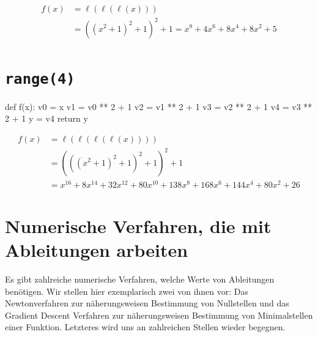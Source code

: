\documentclass[
  a4paper,
  DIV=11]{scrreprt}
\newenvironment{Shaded}{\begin{snugshade}}{\end{snugshade}}
\newcommand{\ControlFlowTok}[1]{\textcolor[rgb]{0.00,0.23,0.31}{#1}}
\newcommand{\DecValTok}[1]{\textcolor[rgb]{0.68,0.00,0.00}{#1}}
\newcommand{\KeywordTok}[1]{\textcolor[rgb]{0.00,0.23,0.31}{#1}}
\newcommand{\NormalTok}[1]{\textcolor[rgb]{0.00,0.23,0.31}{#1}}
\newcommand{\OperatorTok}[1]{\textcolor[rgb]{0.37,0.37,0.37}{#1}}
\theoremstyle{definition}
\theoremstyle{definition}
\theoremstyle{remark}
\begin{document}
\begin{tcolorbox}
\begin{align*}
    f(x) &= \ell(\ell(\ell(x))) \\
         &= ((x^2 + 1)^2 + 1)^2 + 1 = x^8 + 4x^6 + 8x^4 + 8x^2 + 5
\end{align*}

\section{\texorpdfstring{\texttt{range(4)}}{range(4)}}

\begin{Shaded}
\begin{Highlighting}[]
\KeywordTok{def}\NormalTok{ f(x):}
\NormalTok{    v0 }\OperatorTok{=}\NormalTok{ x}
\NormalTok{    v1 }\OperatorTok{=}\NormalTok{ v0 }\OperatorTok{**} \DecValTok{2} \OperatorTok{+} \DecValTok{1}
\NormalTok{    v2 }\OperatorTok{=}\NormalTok{ v1 }\OperatorTok{**} \DecValTok{2} \OperatorTok{+} \DecValTok{1}
\NormalTok{    v3 }\OperatorTok{=}\NormalTok{ v2 }\OperatorTok{**} \DecValTok{2} \OperatorTok{+} \DecValTok{1}
\NormalTok{    v4 }\OperatorTok{=}\NormalTok{ v3 }\OperatorTok{**} \DecValTok{2} \OperatorTok{+} \DecValTok{1}
\NormalTok{    y }\OperatorTok{=}\NormalTok{ v4}
    \ControlFlowTok{return}\NormalTok{ y}
\end{Highlighting}
\end{Shaded}

\begin{align*}
    f(x) &= \ell(\ell(\ell(\ell(x)))) \\
         &= (((x^2 + 1)^2 + 1)^2 + 1)^2 + 1 \\
         &= x^{16} + 8x^{14} + 32x^{12} + 80x^{10} + 138x^8 + 168x^6 + 144x^4 + 80x^2 + 26
\end{align*}

\end{tcolorbox}

\hypertarget{sec-NumerischeVerfahren}{%
\section{Numerische Verfahren, die mit Ableitungen
arbeiten}\label{sec-NumerischeVerfahren}}

Es gibt zahlreiche numerische Verfahren, welche Werte von Ableitungen
benötigen. Wir stellen hier exemplarisch zwei von ihnen vor: Das
Newtonverfahren zur näherungsweisen Bestimmung von Nullstellen und das
Gradient Descent Verfahren zur näherungsweisen Bestimmung von
Minimalstellen einer Funktion. Letzteres wird uns an zahlreichen Stellen
wieder begegnen.
\end{document}
